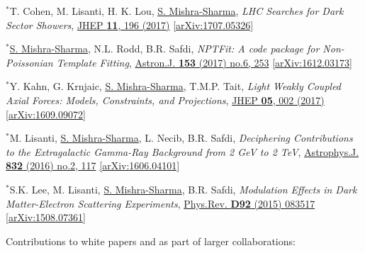 \documentclass[letterpaper,11pt]{article}
\newenvironment{packed_enumerate}[1][]{
\begin{etaremune}[#1]
  \setlength{\itemsep}{3.7pt}
  \setlength{\parskip}{0pt}
  \setlength{\parsep}{0pt}}{\end{etaremune}
}
\begin{document}
\begin{packed_enumerate}[start=43]
  \item $^*$T. Cohen, M. Lisanti, H. K. Lou, \underline{S. Mishra-Sharma}, \emph{LHC Searches for Dark Sector Showers},  \href{https://link.springer.com/article/10.1007/JHEP11(2017)196}{JHEP \textbf{11}, 196 (2017)}  \href{https://arxiv.org/abs/1707.05326}{ [arXiv:1707.05326]}

  \item $^*$\underline{S. Mishra-Sharma}, N.L. Rodd, B.R. Safdi, \emph{NPTFit: A code package for Non-Poissonian Template Fitting},  \href{http://iopscience.iop.org/article/10.3847/1538-3881/aa6d5f/meta}{Astron.J. \textbf{153} (2017) no.6, 253}  \href{https://arxiv.org/abs/1612.03173}{ [arXiv:1612.03173]}

  \item $^*$Y. Kahn, G. Krnjaic, \underline{S. Mishra-Sharma}, T.M.P. Tait, \emph{Light Weakly Coupled Axial Forces: Models, Constraints, and Projections},  \href{https://link.springer.com/article/10.1007%2FJHEP05%282017%29002}{JHEP \textbf{05}, 002 (2017)}  \href{https://arxiv.org/abs/1609.09072}{[arXiv:1609.09072]}

  \item $^*$M. Lisanti, \underline{S. Mishra-Sharma}, L. Necib, B.R. Safdi, \emph{Deciphering Contributions to the Extragalactic Gamma-Ray Background from 2 GeV to 2 TeV},  \href{http://iopscience.iop.org/article/10.3847/0004-637X/832/2/117/meta}{Astrophys.J. \textbf{832} (2016) no.2, 117} \href{https://arxiv.org/abs/1606.04101}{[arXiv:1606.04101]}

  \item $^*$S.K. Lee, M. Lisanti, \underline{S. Mishra-Sharma}, B.R. Safdi, \emph{Modulation Effects in Dark Matter-Electron Scattering Experiments}, \href{https://journals.aps.org/prd/abstract/10.1103/PhysRevD.92.083517}{Phys.Rev. \textbf{D92} (2015) 083517} \href{https://arxiv.org/abs/1508.07361}{[arXiv:1508.07361]}
\end{packed_enumerate}

\noindent
Contributions to white papers and as part of larger collaborations:
\end{document}
